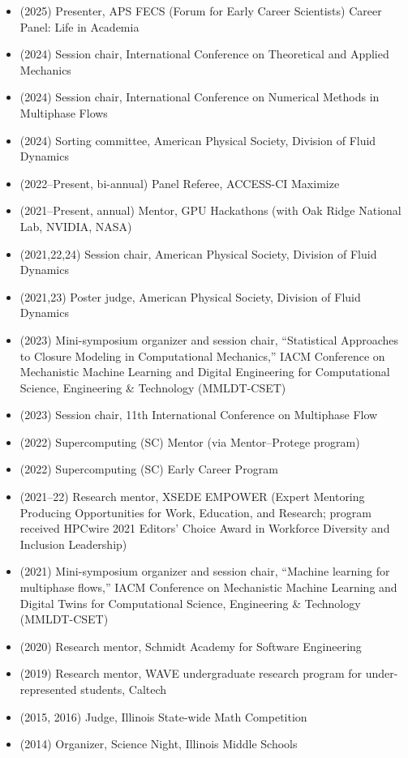 \begin{itemize}
    \item (2025) Presenter, APS FECS (Forum for Early Career Scientists) Career Panel: Life in Academia
    \item (2024) Session chair, International Conference on Theoretical and Applied Mechanics
    \item (2024) Session chair, International Conference on Numerical Methods in Multiphase Flows
    \item (2024) Sorting committee, American Physical Society, Division of Fluid Dynamics
    \item (2022--Present, bi-annual) Panel Referee, ACCESS-CI Maximize
    \item (2021--Present, annual) Mentor, GPU Hackathons (with Oak Ridge National Lab, NVIDIA, NASA)
    \item (2021,22,24) Session chair, American Physical Society, Division of Fluid Dynamics
    \item (2021,23) Poster judge, American Physical Society, Division of Fluid Dynamics
    \item (2023) Mini-symposium organizer and session chair, ``Statistical Approaches to Closure Modeling in Computational Mechanics,'' IACM Conference on Mechanistic Machine Learning and Digital Engineering for Computational Science, Engineering \& Technology (MMLDT-CSET)
    \item (2023) Session chair, 11th International Conference on Multiphase Flow
    \item (2022) Supercomputing (SC) Mentor (via Mentor--Protege program)
    \item (2022) Supercomputing (SC) Early Career Program
    \item (2021--22) Research mentor, XSEDE EMPOWER (Expert Mentoring Producing Opportunities for Work, Education, and Research; program received HPCwire 2021 Editors' Choice Award in Workforce Diversity and Inclusion Leadership)
    \item (2021) Mini-symposium organizer and session chair, ``Machine learning for multiphase flows,'' IACM Conference on Mechanistic Machine Learning and Digital Twins for Computational Science, Engineering \& Technology (MMLDT-CSET)
    \item (2020) Research mentor, Schmidt Academy for Software Engineering
    \item (2019) Research mentor, WAVE undergraduate research program for under-represented students, Caltech
    \item (2015, 2016) Judge, Illinois State-wide Math Competition
    \item (2014) Organizer, Science Night, Illinois Middle Schools
\end{itemize}

